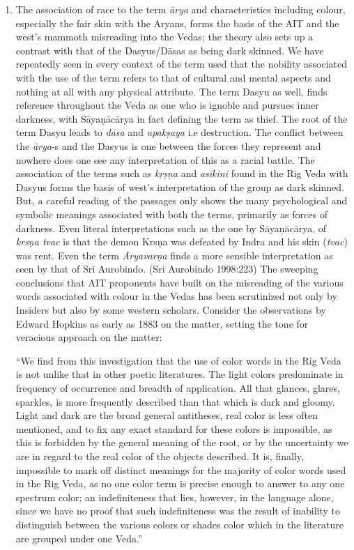 \begin{enumerate}
 \item The association of race to the term \textit{ārya} and characteristics including colour, especially the fair skin with the Aryans, forms the basis of the AIT and the west’s mammoth misreading into the Vedas; the theory also sets up a contrast with that of the Dasyus/Dāsas as being dark skinned. We have repeatedly seen in every context of the term used that the nobility associated with the use of the term refers to that of cultural and mental aspects and nothing at all with any physical attribute. The term Dasyu as well, finds reference throughout the Veda as one who is ignoble and pursues inner darkness, with Sāyaṇācārya in fact defining the term as thief. The root of the term Dasyu leads to \textit{dāsa} and \textit{upakṣaya} i.e destruction. The conflict between the \textit{ārya}-s and the Dasyus is one between the forces they represent and nowhere does one see any interpretation of this as a racial battle. The association of the terms such as \textit{kṛṣṇa }and \textit{asīkini} found in the Rig Veda with Dasyus forms the basis of west’s interpretation of the group as dark skinned. But, a careful reading of the passages only shows the many psychological and symbolic meanings associated with both the terms, primarily as forces of darkness. Even literal interpretations such as the one by Sāyaṇācārya, of \textit{krsṇa tvac} is that the demon Krsṇa was defeated by Indra and his skin (\textit{tvac}) was rent. Even the term \textit{Āryavarṇa} finds a more sensible interpretation as seen by that of Sri Aurobindo. (Sri Aurobindo 1998:223) The sweeping conclusions that AIT proponents have built on the misreading of the various words associated with colour in the Vedas has been scrutinized not only by Insiders but also by some western scholars. Consider the observations by Edward Hopkins as early as 1883 on the matter, setting the tone for veracious approach on the matter:

\begin{myquote}
“We find from this investigation that the use of color words in the Rig Veda is not unlike that in other poetic literatures. The light colors predominate in frequency of occurrence and breadth of application. All that glances, glares, sparkles, is more frequently described than that which is dark and gloomy. Light and dark are the broad general antitheses, real color is less often mentioned, and to fix any exact standard for these colors is impossible, as this is forbidden by the general meaning of the root, or by the uncertainty we are in regard to the real color of the objects described. It is, finally, impossible to mark off distinct meanings for the majority of color words used in the Rig Veda, as no one color term is precise enough to answer to any one spectrum color; an indefiniteness that lies, however, in the language alone, since we have no proof that such indefiniteness was the result of inability to distinguish between the various colors or shades color which in the literature are grouped under one Veda.”


\end{myquote}
\end{enumerate}
